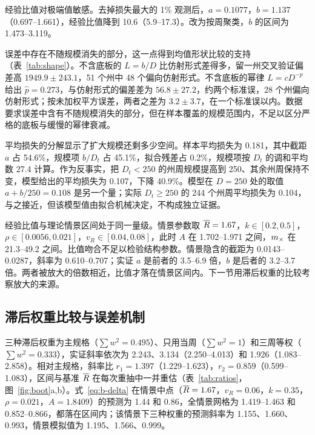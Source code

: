 经验比值对极端值敏感。去掉损失最大的 1\% 观测后，$a=0.1077$，$b=1.137$（0.697--1.661），经验比值降到 10.6（5.9--17.3）。改为按周聚类，$b$ 的区间为 1.473--3.119。

误差中存在不随规模消失的部分，这一点得到均值形状比较的支持（表~\ref{tab:shape}）。不含底板的 $L=b/D$ 比仿射形式差得多，留一州交叉验证偏差高 $1949.9\pm243.1$，51 个州中 48 个偏向仿射形式。不含底板的幂律 $L=cD^{-p}$ 给出 $\hat p=0.273$，与仿射形式的偏差差为 $56.8\pm27.2$，约两个标准误，28 个州偏向仿射形式；按未加权平方误差，两者之差为 $3.2\pm3.7$，在一个标准误以内。数据要求误差中含有不随规模消失的部分，但在样本覆盖的规模范围内，不足以区分严格的底板与缓慢的幂律衰减。



平均损失的分解显示了扩大规模还剩多少空间。样本平均损失为 0.181，其中截距 $a$ 占 54.6\%，规模项 $b/D_t$ 占 45.1\%，拟合残差占 0.2\%，规模项按 $D_t$ 的调和平均数 27.4 计算。作为反事实，把 $D_t<250$ 的州周规模提高到 250、其余州周保持不变，模型给出的平均损失为 0.107，下降 40.9\%。模型在 $D=250$ 处的取值 $a+b/250=0.108$ 是另一个量；实际 $D_t\geq250$ 的 244 个州周平均损失为 0.104，与之接近，但该模型值由拟合机械决定，不构成独立证据。

经验比值与理论情景区间处于同一量级。情景参数取 $\overline{R}=1.67$，$k\in[0.2,0.5]$\citep{lloydsmith2005superspreading}，$\rho\in[0.0056,0.021]$\citep{zhou2012hospitalizations, tokars2018seasonal}，$v_R\in[0.04,0.08]$，此时 $A$ 在 1.702--1.971 之间，$m_{\times}$ 在 21.3--49.2 之间。比值吻合不足以检验结构参数。情景隐含的截距为 0.0143--0.0287，斜率为 0.610--0.707；实证 $a$ 是前者的 3.5--6.9 倍，$b$ 是后者的 3.2--3.7 倍。两者被放大的倍数相近，比值才落在情景区间内。下一节用滞后权重的比较考察放大的来源。

\subsection{滞后权重比较与误差机制}
\label{sec:res-inflation}

三种滞后权重为主规格（$\sum w^2=0.495$）、只用当周（$\sum w^2=1$）和三周等权（$\sum w^2=0.333$），实证斜率依次为 2.243、3.134（2.250--4.013）和 1.926（1.083--2.858）。相对主规格，斜率比 $r_1=1.397$（1.229--1.623），$r_2=0.859$（0.599--1.083），区间与基准 $\overline{R}$ 在每次重抽中一并重估（表~\ref{tab:ratios}，图~\ref{fig:boot}a,b）。式~\eqref{eq:b-delta} 在情景中点（$\overline{R}=1.67$，$v_R=0.06$，$k=0.35$，$\rho=0.021$，$A=1.8409$）的预测为 1.44 和 0.86，全情景网格为 1.419--1.463 和 0.852--0.866，都落在区间内；该情景下三种权重的预测斜率为 1.155、1.660、0.993，情景模拟值为 1.195、1.566、0.999。

